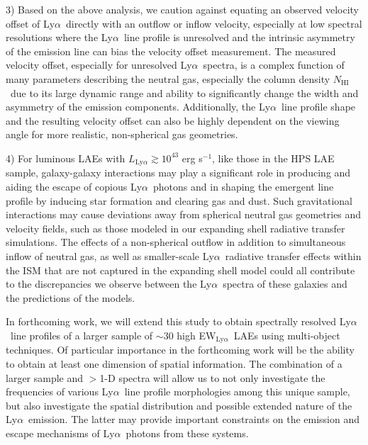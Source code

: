 \documentclass{emulateapj}
\newcommand{\lya}{Ly$\alpha$}
\def\nh{$N_{\mathrm{HI}}$}
\def\ewlya{EW$_{\mathrm{Ly}\alpha}$}
\begin{document}
3) Based on the above analysis, we caution against equating an observed velocity offset of \lya\ directly with an outflow or inflow velocity, especially at low spectral resolutions where the \lya\ line profile is unresolved and the intrinsic asymmetry of the emission line can bias the velocity offset measurement. The measured velocity offset, especially for unresolved \lya\ spectra, is a complex function of many parameters describing the neutral gas, especially the column density \nh\ due to its large dynamic range and ability to significantly change the width and asymmetry of the emission components. Additionally, the \lya\ line profile shape and the resulting velocity offset can also be highly dependent on the viewing angle for more realistic, non-spherical gas geometries. 

4) For luminous LAEs with $L_{\mathrm{Ly}\alpha} \gtrsim 10^{43}$ erg s$^{-1}$, like those in the HPS LAE sample, galaxy-galaxy interactions may play a significant role in producing and aiding the escape of copious \lya\ photons and in shaping the emergent line profile by inducing star formation and clearing gas and dust. Such gravitational interactions may cause deviations away from spherical neutral gas geometries and velocity fields, such as those modeled in our expanding shell radiative transfer simulations. The effects of a non-spherical outflow in addition to simultaneous inflow of neutral gas, as well as smaller-scale \lya\ radiative transfer effects within the ISM that are not captured in the expanding shell model could all contribute to the discrepancies we observe between the \lya\ spectra of these galaxies and the predictions of the models. 

In forthcoming work, we will extend this study to obtain spectrally resolved \lya\ line profiles of a larger sample of $\sim30$ high \ewlya\ LAEs using multi-object techniques. Of particular importance in the forthcoming work will be the ability to obtain at least one dimension of spatial information. The combination of a larger sample and $>$1-D spectra will allow us to not only investigate the frequencies of various \lya\ line profile morphologies among this unique sample, but also investigate the spatial distribution and possible extended nature of the \lya\ emission. The latter may provide important constraints on the emission and escape mechanisms of \lya\ photons from these systems.\\
\end{document}
